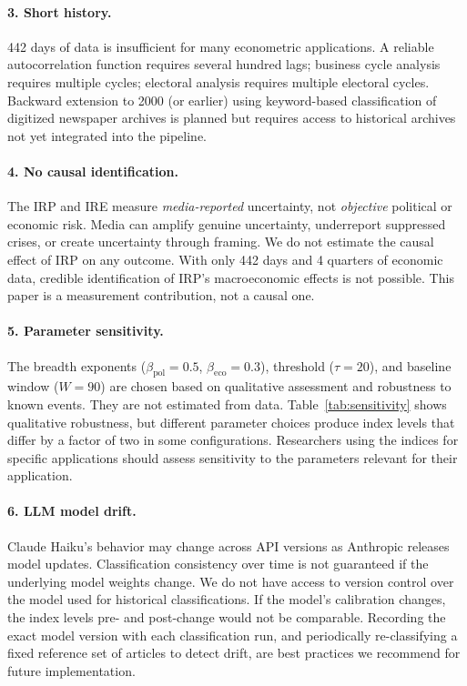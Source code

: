 \documentclass[12pt,a4paper]{article}
\begin{document}
\paragraph{3. Short history.}
442 days of data is insufficient for many econometric applications.  A
reliable autocorrelation function requires several hundred lags; business
cycle analysis requires multiple cycles; electoral analysis requires
multiple electoral cycles.  Backward extension to 2000 (or earlier) using
keyword-based classification of digitized newspaper archives is planned but
requires access to historical archives not yet integrated into the pipeline.

\paragraph{4. No causal identification.}
The IRP and IRE measure \emph{media-reported} uncertainty, not
\emph{objective} political or economic risk.  Media can amplify genuine
uncertainty, underreport suppressed crises, or create uncertainty through
framing.  We do not estimate the causal effect of IRP on any outcome.
With only 442 days and 4 quarters of economic data, credible
identification of IRP's macroeconomic effects is not possible.
This paper is a measurement contribution, not a causal one.

\paragraph{5. Parameter sensitivity.}
The breadth exponents ($\beta_{\text{pol}} = 0.5$, $\beta_{\text{eco}} = 0.3$),
threshold ($\tau = 20$), and baseline window ($W = 90$) are chosen based on
qualitative assessment and robustness to known events.  They are not
estimated from data.  Table~\ref{tab:sensitivity} shows qualitative
robustness, but different parameter choices produce index levels that differ
by a factor of two in some configurations.  Researchers using the indices
for specific applications should assess sensitivity to the parameters relevant
for their application.

\paragraph{6. LLM model drift.}
Claude Haiku's behavior may change across API versions as Anthropic releases
model updates.  Classification consistency over time is not guaranteed if
the underlying model weights change.  We do not have access to version
control over the model used for historical classifications.  If the model's
calibration changes, the index levels pre- and post-change would not be
comparable.  Recording the exact model version with each classification
run, and periodically re-classifying a fixed reference set of articles to
detect drift, are best practices we recommend for future implementation.
\end{document}
